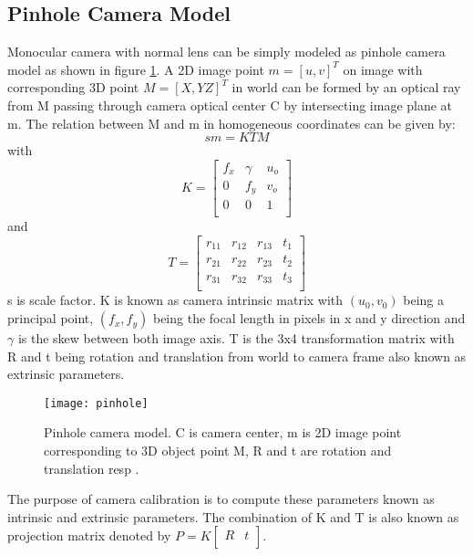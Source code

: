 \subsection{Pinhole Camera Model}
Monocular camera with normal lens can be simply modeled as pinhole camera model as shown in figure \ref{fig:pinhole}. A 2D image point  $ m = [u,v]^{T} $ on image with corresponding 3D point $ M = [ X,Y Z]^{T} $ in world can be formed by an optical ray from M passing through camera optical center C by intersecting image plane at m. The relation between M and m in homogeneous coordinates can be given by: 
\begin{equation*}
sm= KTM 
\end{equation*} 
with
\begin{equation*}
K = \begin{bmatrix}
f_{x} & \gamma & u_{o} \\
0    &  f_{y} & v_{o} \\
0    &   0    & 1 \\
\end{bmatrix}
\end{equation*} 
and
\begin{equation*}
T = \begin{bmatrix}
r_{11} & r_{12} & r_{13} & t_{1} \\
r_{21} & r_{22} & r_{23} & t_{2} \\
r_{31} & r_{32} & r_{33} & t_{3} \\
\end{bmatrix}
\end{equation*} 
s is scale factor. K is known as camera intrinsic matrix with $ (u_{0},v_{0}) $ being a principal point, $ (f_{x},f_{y}) $ being the focal length in pixels in x and y direction and $ \gamma $ is the skew between both image axis. T is the 3x4 transformation matrix with R and t being rotation and translation from world to camera frame also known as extrinsic parameters.\\
\begin{figure}[h!]
	\centering
	\texttt{[image: pinhole]}
	\caption{Pinhole camera model. C is camera center, m is 2D image point corresponding to 3D object point M, R and t are rotation and translation resp \cite{cameracalib}.}
	\label{fig:pinhole}
\end{figure}
\newline
The purpose of camera calibration is to compute these parameters known as intrinsic and extrinsic parameters. The combination of K and T is also known as projection matrix denoted by $ P = K \begin{bmatrix} 
            R & t \\
            \end{bmatrix} $.

